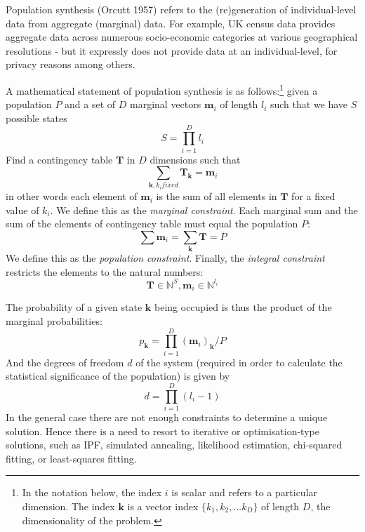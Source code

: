 \documentclass{JASSS}
\begin{document}
Population synthesis (Orcutt 1957) refers to the (re)generation of
individual-level data from aggregate (marginal) data. For example, UK
census data provides aggregate data across numerous socio-economic
categories at various geographical resolutions - but it expressly does
not provide data at an individual-level, for privacy reasons among
others.

A mathematical statement of population synthesis is as
follows:\footnote{In the notation below, the index \(i\) is scalar and
  refers to a particular dimension. The index \(\mathbf{k}\) is a vector
  index \(\{k_1, k_2,...k_D\}\) of length \(D\), the dimensionality of
  the problem.}
given a population \(P\) and a set of \(D\) marginal vectors
\(\mathbf{m}_i\) of length \(l_i\) such that we have \(S\) possible
states
\begin{equation}
S=\prod\limits_{i=1}^{D}l_i
\end{equation}
Find a contingency table \(\mathbf T\) in \(D\) dimensions such that
\begin{equation}
\sum\limits_{\mathbf{k}, k_i fixed} \mathbf{T}_\mathbf{k} = \mathbf{m}_i
\end{equation}
in other words each element of \(\mathbf{m}_i\) is the sum of all
elements in \(\mathbf{T}\) for a fixed value of \(k_i\). We define this
as the \emph{marginal constraint}.
Each marginal sum and the sum of the elements of contingency table must
equal the population \(P\):
\begin{equation}
\sum\limits \mathbf{m}_{i} = \sum\limits_\mathbf{k} \mathbf{T} = P
\end{equation}
We define this as the \emph{population constraint}. 
Finally, the
\emph{integral constraint} restricts the elements to the natural
numbers:
\begin{equation}
{\mathbf{T} \in \mathbb{N}^S,\mathbf{m}_i} \in \mathbb{N}^{l_i}
\end{equation}

The probability of a given state \(\mathbf{k}\) being occupied is thus
the product of the marginal probabilities:
\begin{equation}
p_{\mathbf{k}} = \prod\limits_{i=1}^{D}(\mathbf{m}_i)_\mathbf{k}/P
\end{equation}
And the degrees of freedom \(d\) of the system (required in order to
calculate the statistical significance of the population) is given by
\begin{equation}
d=\prod\limits_{i=1}^{D}(l_i-1)
\end{equation}
In the general case there are not enough constraints to determine a
unique solution. Hence there is a need to resort to iterative or
optimisation-type solutions, such as IPF, simulated annealing,
likelihood estimation, chi-squared fitting, or least-squares fitting.
\end{document}
